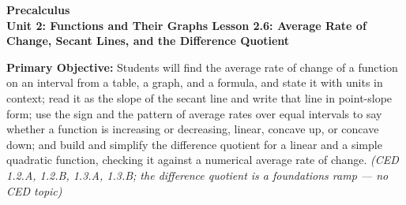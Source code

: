 \documentclass[10pt]{article}
\newcommand{\CourseName}{Precalculus}
\newcommand{\UnitNumberName}{Unit 2: Functions and Their Graphs \quad}
\newcommand{\LessonNumberName}{Lesson 2.6: Average Rate of Change, Secant Lines, and the Difference Quotient}
\begin{document}
\begin{center}
    {\Large\bfseries \CourseName \\
    {\small\bfseries \UnitNumberName \LessonNumberName}}
\end{center}

\begin{tcolorbox}[colback=lilac, colframe=plum, boxrule=0.9pt, arc=2mm,
    left=2mm, right=2mm, top=1.5mm, bottom=1.5mm]
    \textbf{Primary Objective:} Students will find the average rate of change of a function
    on an interval from a table, a graph, and a formula, and state it with units in context;
    read it as the slope of the secant line and write that line in point-slope form; use the
    sign and the pattern of average rates over equal intervals to say whether a function is
    increasing or decreasing, linear, concave up, or concave down; and build and simplify the
    difference quotient for a linear and a simple quadratic function, checking it against a
    numerical average rate of change.
    \hfill\textit{\small (CED 1.2.A, 1.2.B, 1.3.A, 1.3.B; the difference quotient is a
    foundations ramp --- no CED topic)}
\end{tcolorbox}
\end{document}
